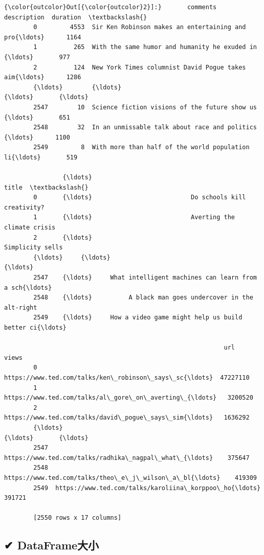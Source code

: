 \documentclass[11pt]{ctexart}
\begin{document}
\begin{Verbatim}[commandchars=\\\{\}]
{\color{outcolor}Out[{\color{outcolor}2}]:}       comments                                        description  duration  \textbackslash{}
        0         4553  Sir Ken Robinson makes an entertaining and pro{\ldots}      1164   
        1          265  With the same humor and humanity he exuded in {\ldots}       977   
        2          124  New York Times columnist David Pogue takes aim{\ldots}      1286   
        {\ldots}        {\ldots}                                                {\ldots}       {\ldots}   
        2547        10  Science fiction visions of the future show us {\ldots}       651   
        2548        32  In an unmissable talk about race and politics {\ldots}      1100   
        2549         8  With more than half of the world population li{\ldots}       519   
        
                {\ldots}                                                 title  \textbackslash{}
        0       {\ldots}                           Do schools kill creativity?   
        1       {\ldots}                           Averting the climate crisis   
        2       {\ldots}                                      Simplicity sells   
        {\ldots}     {\ldots}                                                   {\ldots}   
        2547    {\ldots}     What intelligent machines can learn from a sch{\ldots}   
        2548    {\ldots}          A black man goes undercover in the alt-right   
        2549    {\ldots}     How a video game might help us build better ci{\ldots}   
        
                                                            url     views  
        0     https://www.ted.com/talks/ken\_robinson\_says\_sc{\ldots}  47227110  
        1     https://www.ted.com/talks/al\_gore\_on\_averting\_{\ldots}   3200520  
        2     https://www.ted.com/talks/david\_pogue\_says\_sim{\ldots}   1636292  
        {\ldots}                                                 {\ldots}       {\ldots}  
        2547  https://www.ted.com/talks/radhika\_nagpal\_what\_{\ldots}    375647  
        2548  https://www.ted.com/talks/theo\_e\_j\_wilson\_a\_bl{\ldots}    419309  
        2549  https://www.ted.com/talks/karoliina\_korppoo\_ho{\ldots}    391721  
        
        [2550 rows x 17 columns]
\end{Verbatim}
            
    \hypertarget{dataframeux5927ux5c0f}{%
\subsection{✔ DataFrame大小}\label{dataframeux5927ux5c0f}}
\end{document}
